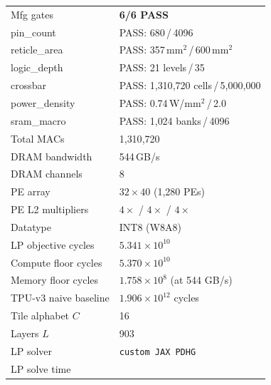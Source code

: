 \begin{table}[h]
\begin{tabular}{@{}ll@{}}
\midrule
Mfg gates               & \textcolor{green!60!black}{\textbf{6/6 PASS}} \\
\quad pin\_count         & PASS: 680\,/\,4096 \\
\quad reticle\_area      & PASS: 357\,mm$^2$\,/\,600\,mm$^2$ \\
\quad logic\_depth       & PASS: 21 levels\,/\,35 \\
\quad crossbar           & PASS: 1{,}310{,}720 cells\,/\,5{,}000{,}000 \\
\quad power\_density     & PASS: 0.74\,W/mm$^2$\,/\,2.0 \\
\quad sram\_macro        & PASS: 1{,}024 banks\,/\,4096 \\
\midrule
Total MACs              & 1{,}310{,}720 \\
DRAM bandwidth          & 544\,GB/s \\
DRAM channels           & 8 \\
PE array                & $32 \times 40$ (1{,}280 PEs) \\
PE L2 multipliers       & $4\times$ / $4\times$ / $4\times$ \\
Datatype                & INT8 (W8A8) \\
LP objective cycles     & $5.341 \times 10^{10}$ \\
Compute floor cycles    & $5.370 \times 10^{10}$ \\
Memory floor cycles     & $1.758 \times 10^{8}$ (at 544 GB/s) \\
TPU-v3 naive baseline   & $1.906 \times 10^{12}$ cycles \\
Tile alphabet $C$       & 16 \\
Layers $L$              & 903 \\
LP solver               & \texttt{custom JAX PDHG} \\
LP solve time           &  \\
\bottomrule
\end{tabular}
\end{table}

\clearpage
